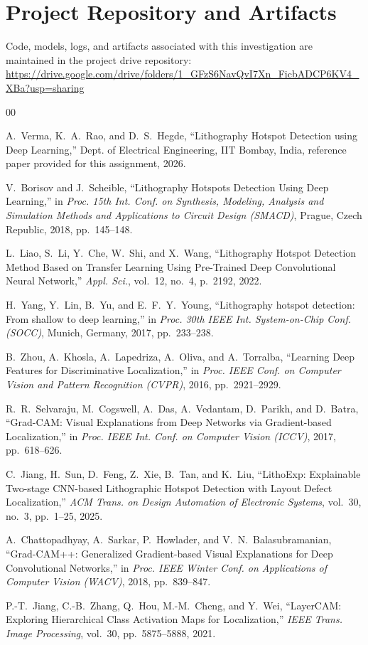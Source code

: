 \documentclass[conference]{IEEEtran}
\begin{document}
\section*{Project Repository and Artifacts}
Code, models, logs, and artifacts associated with this investigation are maintained in the project drive repository:
\url{https://drive.google.com/drive/folders/1_GFzS6NavQvI7Xn_FicbADCP6KV4_XBa?usp=sharing}

\balance

\begin{thebibliography}{00}

A.~Verma, K.~A.~Rao, and D.~S.~Hegde, ``Lithography Hotspot Detection using Deep Learning,'' Dept. of Electrical Engineering, IIT Bombay, India, reference paper provided for this assignment, 2026.

V.~Borisov and J.~Scheible, ``Lithography Hotspots Detection Using Deep Learning,'' in \emph{Proc. 15th Int. Conf. on Synthesis, Modeling, Analysis and Simulation Methods and Applications to Circuit Design (SMACD)}, Prague, Czech Republic, 2018, pp.~145--148.

L.~Liao, S.~Li, Y.~Che, W.~Shi, and X.~Wang, ``Lithography Hotspot Detection Method Based on Transfer Learning Using Pre-Trained Deep Convolutional Neural Network,'' \emph{Appl. Sci.}, vol.~12, no.~4, p.~2192, 2022.

H.~Yang, Y.~Lin, B.~Yu, and E.~F.~Y.~Young, ``Lithography hotspot detection: From shallow to deep learning,'' in \emph{Proc. 30th IEEE Int. System-on-Chip Conf. (SOCC)}, Munich, Germany, 2017, pp.~233--238.

B.~Zhou, A.~Khosla, A.~Lapedriza, A.~Oliva, and A.~Torralba, ``Learning Deep Features for Discriminative Localization,'' in \emph{Proc. IEEE Conf. on Computer Vision and Pattern Recognition (CVPR)}, 2016, pp.~2921--2929.

R.~R.~Selvaraju, M.~Cogswell, A.~Das, A.~Vedantam, D.~Parikh, and D.~Batra, ``Grad-CAM: Visual Explanations from Deep Networks via Gradient-based Localization,'' in \emph{Proc. IEEE Int. Conf. on Computer Vision (ICCV)}, 2017, pp.~618--626.

C.~Jiang, H.~Sun, D.~Feng, Z.~Xie, B.~Tan, and K.~Liu, ``LithoExp: Explainable Two-stage CNN-based Lithographic Hotspot Detection with Layout Defect Localization,'' \emph{ACM Trans. on Design Automation of Electronic Systems}, vol.~30, no.~3, pp.~1--25, 2025.

A.~Chattopadhyay, A.~Sarkar, P.~Howlader, and V.~N.~Balasubramanian, ``Grad-CAM++: Generalized Gradient-based Visual Explanations for Deep Convolutional Networks,'' in \emph{Proc. IEEE Winter Conf. on Applications of Computer Vision (WACV)}, 2018, pp.~839--847.

P.-T.~Jiang, C.-B.~Zhang, Q.~Hou, M.-M.~Cheng, and Y.~Wei, ``LayerCAM: Exploring Hierarchical Class Activation Maps for Localization,'' \emph{IEEE Trans. Image Processing}, vol.~30, pp.~5875--5888, 2021.

\end{thebibliography}
\end{document}

